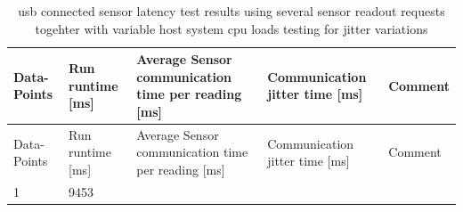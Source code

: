 \begin{longtable}[]{@{}lllll@{}}
\caption{\gls{usb} connected sensor latency test results using several
sensor readout requests togehter with variable host system cpu loads
testing for jitter variations
\label{(+usb)_connected_sensor_latency_test_results_using_several_sensor_readout_requests_togehter_with_variable_host_system_cpu_loads_testing_for_jitter_variations.csv}}\tabularnewline
\toprule
\begin{minipage}[b]{0.08\columnwidth}\raggedright
Data-Points\strut
\end{minipage} & \begin{minipage}[b]{0.11\columnwidth}\raggedright
Run runtime {[}ms{]}\strut
\end{minipage} & \begin{minipage}[b]{0.35\columnwidth}\raggedright
Average Sensor communication time per reading {[}ms{]}\strut
\end{minipage} & \begin{minipage}[b]{0.22\columnwidth}\raggedright
Communication jitter time {[}ms{]}\strut
\end{minipage} & \begin{minipage}[b]{0.10\columnwidth}\raggedright
Comment\strut
\end{minipage}\tabularnewline
\midrule
\endfirsthead
\toprule
\begin{minipage}[b]{0.08\columnwidth}\raggedright
Data-Points\strut
\end{minipage} & \begin{minipage}[b]{0.11\columnwidth}\raggedright
Run runtime {[}ms{]}\strut
\end{minipage} & \begin{minipage}[b]{0.35\columnwidth}\raggedright
Average Sensor communication time per reading {[}ms{]}\strut
\end{minipage} & \begin{minipage}[b]{0.22\columnwidth}\raggedright
Communication jitter time {[}ms{]}\strut
\end{minipage} & \begin{minipage}[b]{0.10\columnwidth}\raggedright
Comment\strut
\end{minipage}\tabularnewline
\midrule
\endhead
\begin{minipage}[t]{0.08\columnwidth}\raggedright
1\strut
\end{minipage} & \begin{minipage}[t]{0.11\columnwidth}\raggedright
9453\strut
\end{minipage} & \begin{minipage}[t]{0.35\columnwidth}\raggedright

\end{minipage}
\end{longtable}

